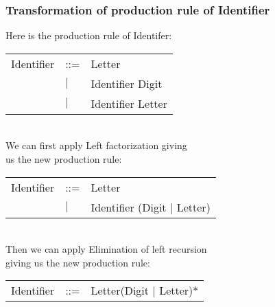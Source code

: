 		\subsubsection{Transformation of production rule of Identifier}
			Here is the production rule of Identifer: \\
			
			\begin{tabular}{l l l}
				Identifier			&	::=	&Letter\\
									&$\mid$	&Identifier Digit\\
									&$\mid$	&Identifier Letter\\
			\end{tabular} \\
			
			We can first apply Left factorization giving \\ 
			us the new production rule: \\
			
			\begin{tabular}{l l l}
				Identifier			&	::=	&Letter\\
									&$\mid$	&Identifier (Digit $\mid$ Letter)\\
			\end{tabular}\\	
			
			Then we can apply Elimination of left recursion \\
			giving us the new production rule: \\
			
			\begin{tabular}{l l l}
				Identifier			&	::=	&Letter(Digit $\mid$ Letter)*\\
			\end{tabular}	
			